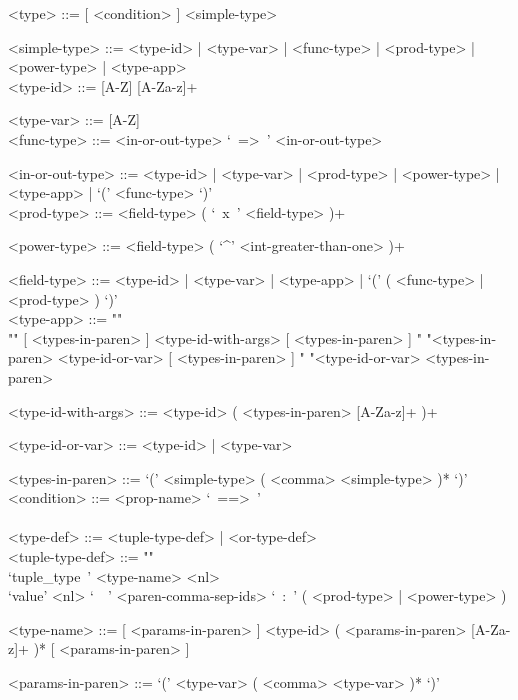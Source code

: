 \documentclass{article}
\begin{document}
\begin{grammar}
<type> ::= [ <condition> ]  <simple-type> 

<simple-type> ::=
<type-id> | <type-var> | <func-type> | <prod-type> | <power-type> | <type-app>
\\

<type-id> ::= [A-Z] [A-Za-z]+ 

<type-var> ::= [A-Z]
\\

<func-type> ::= <in-or-out-type> `\ =>\ ' <in-or-out-type>

<in-or-out-type> ::=
<type-id> | <type-var> | <prod-type> | <power-type> | <type-app> |
`(' <func-type> `)'
\\

<prod-type> ::= <field-type> ( `\ x\ ' <field-type> )+

<power-type> ::= <field-type> ( `^' <int-greater-than-one> )+

<field-type> ::=
<type-id> | <type-var> | <type-app> | `(' ( <func-type> | <prod-type> ) `)'
\\

<type-app> ::= ""\\""
[ <types-in-paren> ] <type-id-with-args> [ <types-in-paren> ]
\alt " "<types-in-paren> <type-id-or-var> [ <types-in-paren> ]
\alt " "<type-id-or-var> <types-in-paren>

<type-id-with-args> ::= <type-id> ( <types-in-paren> [A-Za-z]+ )+

<type-id-or-var> ::= <type-id> | <type-var>

<types-in-paren> ::= `(' <simple-type> ( <comma> <simple-type> )* `)'
\\

<condition> ::= <prop-name> `\ ==>\ ' 
\\
\\

<type-def> ::= <tuple-type-def> | <or-type-def>
\\

<tuple-type-def> ::= ""\\
`tuple_type\ ' <type-name> <nl> \\
`value' <nl> `\ \ ' <paren-comma-sep-ids> `\ :\ '
( <prod-type> | <power-type> )

<type-name> ::= 
[ <params-in-paren> ] <type-id> ( <params-in-paren> [A-Za-z]+ )*
[ <params-in-paren> ]

<params-in-paren> ::= `(' <type-var> ( <comma> <type-var> )* `)'
\\


\end{grammar}
\end{document}
